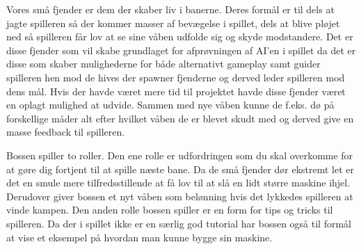 Vores små fjender er dem der skaber liv i banerne. Deres formål er til dels at jagte spilleren så der kommer masser af bevægelse i spillet, dels at blive pløjet ned så spilleren får lov at se sine våben udfolde sig og skyde modstandere. Det er disse fjender som vil skabe grundlaget for afprøvningen af AI'en i spillet da det er disse som skaber mulighederne for både alternativt gameplay samt guider spilleren hen mod de hives der spawner fjenderne og derved leder spilleren mod dens mål. Hvis der havde været mere tid til projektet havde disse fjender været en oplagt mulighed at udvide. Sammen med nye våben kunne de f.eks. dø på forskellige måder alt efter hvilket våben de er blevet skudt med og derved give en masse feedback til spilleren.

Bossen spiller to roller. Den ene rolle er udfordringen som du skal overkomme for at gøre dig fortjent til at spille næste bane. Da de små fjender dør ekstremt let er det en smule mere tilfredsstillende at få lov til at slå en lidt større maskine ihjel. Derudover giver bossen et nyt våben som belønning hvis det lykkedes spilleren at vinde kampen.
Den anden rolle bossen spiller er en form for tips og tricks til spilleren. Da der i spillet ikke er en særlig god tutorial har bossen også til formål at vise et eksempel på hvordan man kunne bygge sin maskine.


